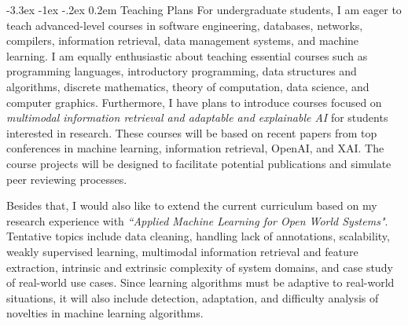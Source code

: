 \documentclass[10pt]{article}
\makeatletter
\def \section {%
    \@startsection {section}
    {1}%
    {\z@}%
    {-3.3ex \@plus -1ex \@minus -.2ex}%
    {0.2em}
    {\normalfont \Large \scshape \bfseries} %
    }
\makeatother
\begin{document}

\section{Teaching Plans}
For undergraduate students, I am eager to teach advanced-level courses in software engineering, databases, networks, compilers, information retrieval, data management systems, and machine learning. I am equally enthusiastic about teaching essential courses such as programming languages, introductory programming, data structures and algorithms, discrete mathematics, theory of computation, data science, and computer graphics. Furthermore, I have plans to introduce courses focused on \textit{multimodal information retrieval and adaptable and explainable AI} for students interested in research. These courses will be based on recent papers from top conferences in machine learning, information retrieval, OpenAI, and XAI. The course projects will be designed to facilitate potential publications and simulate peer reviewing processes.
%

Besides that, I would also like to extend the current curriculum based on my research experience with \textit{``Applied Machine Learning for Open World Systems"}. Tentative topics include data cleaning, handling lack of annotations, scalability, weakly supervised learning, multimodal information retrieval and feature extraction, intrinsic and extrinsic complexity of system domains, and case study of real-world use cases. Since learning algorithms must be adaptive to real-world situations, it will also include detection, adaptation, and difficulty analysis of novelties in machine learning algorithms.
\end{document}
